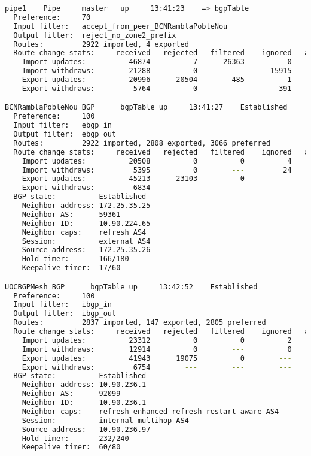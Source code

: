 \begin{lstlisting}[language=bash, caption={Birdc4 show protocols all}]
pipe1    Pipe     master   up     13:41:23    => bgpTable
  Preference:     70
  Input filter:   accept_from_peer_BCNRamblaPobleNou
  Output filter:  reject_no_zone2_prefix
  Routes:         2922 imported, 4 exported
  Route change stats:     received   rejected   filtered    ignored   accepted
    Import updates:          46874          7      26363          0      20504
    Import withdraws:        21288          0        ---      15915       5371
    Export updates:          20996      20504        485          1          6
    Export withdraws:         5764          0        ---        391          2

BCNRamblaPobleNou BGP      bgpTable up     13:41:27    Established
  Preference:     100
  Input filter:   ebgp_in
  Output filter:  ebgp_out
  Routes:         2922 imported, 2808 exported, 3066 preferred
  Route change stats:     received   rejected   filtered    ignored   accepted
    Import updates:          20508          0          0          4      20504
    Import withdraws:         5395          0        ---         24       5371
    Export updates:          45213      23103          0        ---      22110
    Export withdraws:         6834        ---        ---        ---      14858
  BGP state:          Established
    Neighbor address: 172.25.35.25
    Neighbor AS:      59361
    Neighbor ID:      10.90.224.65
    Neighbor caps:    refresh AS4
    Session:          external AS4
    Source address:   172.25.35.26
    Hold timer:       166/180
    Keepalive timer:  17/60

UOCBGPMesh BGP      bgpTable up     13:42:52    Established
  Preference:     100
  Input filter:   ibgp_in
  Output filter:  ibgp_out
  Routes:         2837 imported, 147 exported, 2805 preferred
  Route change stats:     received   rejected   filtered    ignored   accepted
    Import updates:          23312          0          0          2      23310
    Import withdraws:        12914          0        ---          0      12914
    Export updates:          41943      19075          0        ---      22868
    Export withdraws:         6754        ---        ---        ---      13872
  BGP state:          Established
    Neighbor address: 10.90.236.1
    Neighbor AS:      92099
    Neighbor ID:      10.90.236.1
    Neighbor caps:    refresh enhanced-refresh restart-aware AS4
    Session:          internal multihop AS4
    Source address:   10.90.236.97
    Hold timer:       232/240
    Keepalive timer:  60/80
\end{lstlisting}